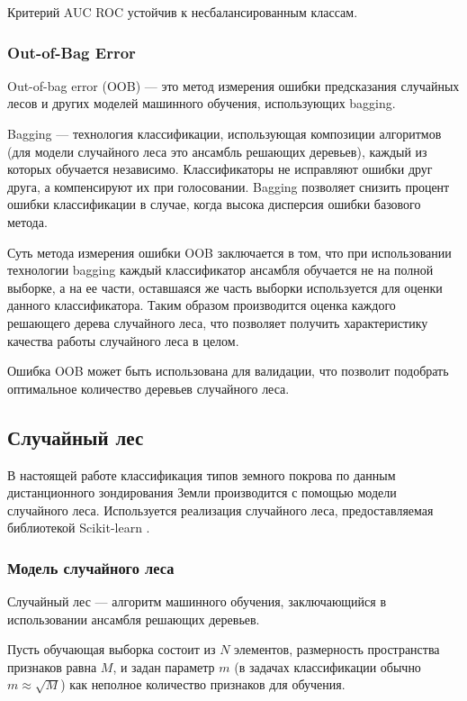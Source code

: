 \documentclass[14pt, a4paper, oneside]{extarticle}
\begin{document}
Критерий AUC ROC устойчив к несбалансированным классам.

\subsubsection{Out-of-Bag Error}
Out-of-bag error (OOB) --- это метод измерения ошибки предсказания случайных лесов и других моделей машинного обучения, использующих bagging.

Bagging --- технология классификации, использующая композиции алгоритмов (для модели случайного леса это ансамбль решающих деревьев), каждый из которых обучается независимо. Классификаторы не исправляют ошибки друг друга, а компенсируют их при голосовании. Bagging позволяет снизить процент ошибки классификации в случае, когда высока дисперсия ошибки базового метода.

Суть метода измерения ошибки OOB заключается в том, что при использовании технологии bagging каждый классификатор ансамбля обучается не на полной выборке, а на ее части, оставшаяся же часть выборки используется для оценки данного классификатора. Таким образом производится оценка каждого решающего дерева случайного леса, что позволяет получить характеристику качества работы случайного леса в целом.

Ошибка OOB может быть использована для валидации, что позволит подобрать оптимальное количество деревьев случайного леса.

\subsection{Случайный лес}
В настоящей работе классификация типов земного покрова по данным дистанционного зондирования Земли производится с помощью модели случайного леса. Используется реализация случайного леса, предоставляемая библиотекой Scikit-learn \cite{sklearn}.

\subsubsection{Модель случайного леса}
Случайный лес --- алгоритм машинного обучения, заключающийся в использовании ансамбля решающих деревьев.

Пусть обучающая выборка состоит из $N$ элементов, размерность пространства признаков равна $M$, и задан параметр $m$ (в задачах классификации обычно $m \approx \sqrt{M}$) как неполное количество признаков для обучения.
\end{document}
